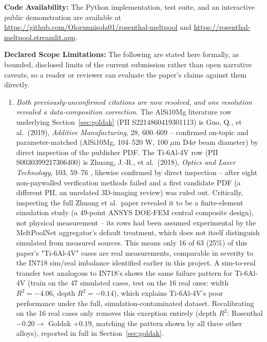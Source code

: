 \documentclass[12pt]{article}
\begin{document}
\noindent\textbf{Code Availability:} The Python implementation, test suite, and an interactive public demonstration are available at \url{https://github.com/Olorunnisola01/rosenthal-meltpool} and \url{https://rosenthal-meltpool.streamlit.app}.

\noindent\textbf{Declared Scope Limitations:} The following are stated here formally, as bounded, disclosed limits of the current submission rather than open narrative caveats, so a reader or reviewer can evaluate the paper's claims against them directly.
\begin{enumerate}
\item \emph{Both previously-unconfirmed citations are now resolved, and one resolution revealed a data-composition correction.} The AlSi10Mg literature row underlying Section~\ref{sec:goldak} (PII S2214860419301113) is Guo, Q., et al.\ (2019), \emph{Additive Manufacturing}, 28, 600--609 \cite{guo2019} -- confirmed on-topic and parameter-matched (AlSi10Mg, 104--520 W, 100 $\mu$m D4$\sigma$ beam diameter) by direct inspection of the publisher PDF. The Ti-6Al-4V row (PII S0030399217306400) is Zhuang, J.-R., et al.\ (2018), \emph{Optics and Laser Technology}, 103, 59--76 \cite{zhuang2018}, likewise confirmed by direct inspection -- after eight non-paywalled verification methods failed and a first candidate PDF (a different PII, an unrelated 3D-imaging review) was ruled out. Critically, inspecting the full Zhuang et al.\ paper revealed it to be a finite-element simulation study (a 49-point ANSYS DOE-FEM central composite design), not physical measurement -- its rows had been assumed experimental by the MeltPoolNet aggregator's default treatment, which does not itself distinguish simulated from measured sources. This means only 16 of 63 (25\%) of this paper's "Ti-6Al-4V" cases are real measurements, comparable in severity to the IN718 sim/real imbalance identified earlier in this project. A sim-to-real transfer test analogous to IN718's shows the same failure pattern for Ti-6Al-4V (train on the 47 simulated cases, test on the 16 real ones: width $R^2=-4.06$, depth $R^2=-0.14$), which explains Ti-6Al-4V's poor performance under the full, simulation-contaminated dataset. Recalibrating on the 16 real cases only removes this exception entirely (depth $R^2$: Rosenthal $-0.20 \rightarrow$ Goldak $+0.19$, matching the pattern shown by all three other alloys), reported in full in Section~\ref{sec:goldak}.

\end{enumerate}
\end{document}
